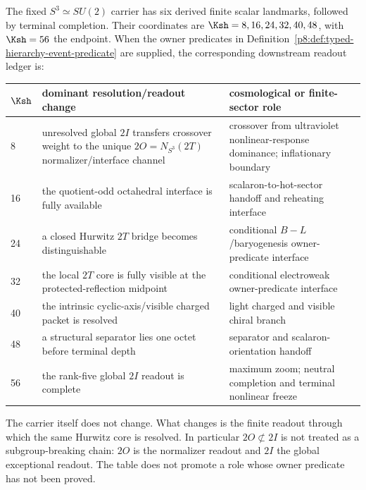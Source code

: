 \documentclass[12pt,a4paper]{article}
\begin{document}
\begin{theorem}
\label{p8:thm:nR-resolution-backed-by-2I-2O}
The fixed \(S^3\simeq SU(2)\) carrier has six derived finite scalar
landmarks, followed by terminal completion.  Their coordinates are
\(\Ksh=8,16,24,32,40,48\), with \(\Ksh=56\) the endpoint.  When the owner
predicates in Definition~\ref{p8:def:typed-hierarchy-event-predicate} are
supplied, the corresponding downstream readout ledger is:
\begin{center}
\begin{tabularx}{0.96\textwidth}{@{}C{1.35cm}X X@{}}
\toprule
\(\Ksh\) & \textbf{dominant resolution/readout change} & \textbf{cosmological or finite-sector role} \\
 & unresolved global \(2I\) transfers crossover weight to the unique \(2O=N_{S^3}(2T)\) normalizer/interface channel & crossover from ultraviolet nonlinear-response dominance; inflationary boundary \\
16 & the quotient-odd octahedral interface is fully available & scalaron-to-hot-sector handoff and reheating interface \\
24 & a closed Hurwitz \(2T\) bridge becomes distinguishable & conditional \(B-L\)/baryogenesis owner-predicate interface \\
32 & the local \(2T\) core is fully visible at the protected-reflection midpoint & conditional electroweak owner-predicate interface \\
40 & the intrinsic cyclic-axis/visible charged packet is resolved & light charged and visible chiral branch \\
48 & a structural separator lies one octet before terminal depth & separator and scalaron-orientation handoff \\
56 & the rank-five global \(2I\) readout is complete & maximum zoom; neutral completion and terminal nonlinear freeze \\
\bottomrule
\end{tabularx}
\end{center}
The carrier itself does not change.  What changes is the finite readout through which the same Hurwitz core is resolved.  In particular \(2O\not\subset2I\) is not treated as a subgroup-breaking chain: \(2O\) is the normalizer readout and \(2I\) the global exceptional readout.  The table does not promote a role whose owner predicate has not been proved.
\end{theorem}
\end{document}
